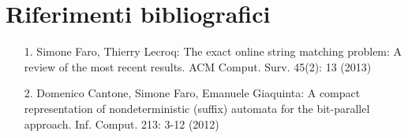 \chapter{Riferimenti bibliografici}

\begin{itemize}

  \item[1.] Simone Faro, Thierry Lecroq: The exact online string matching problem: A review of the most recent results. ACM Comput. Surv. 45(2): 13 (2013)
  
  \item[2.] Domenico Cantone, Simone Faro, Emanuele Giaquinta: A compact representation of nondeterministic (suffix) automata for the bit-parallel approach. Inf. Comput. 213: 3-12 (2012)   
  
\end{itemize}